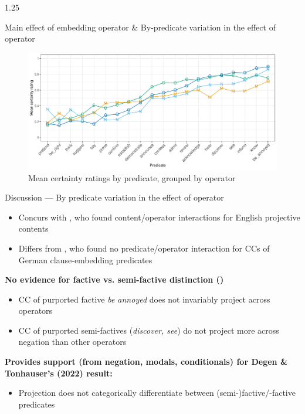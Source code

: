 \documentclass[final]{beamer}
\newlength{\colwidth}
\newlength{\vboxsep}
\begin{document}
\begin{frame}[t]
\begin{columns}[t]
\begin{column}{1.25\colwidth}
\begin{normalbox}{Main effect of embedding operator \& By-predicate variation in the effect of operator}
				\begin{figure}[h]
					\centering
					\includegraphics[width=\linewidth]{projective-pred-op.pdf}
					\vspace{-2\baselineskip}
					\caption{Mean certainty ratings by predicate, grouped by operator}
					\label{fig:figure3}
				\end{figure}
				\vspace{-.8\baselineskip}
			\end{normalbox}
			
			\vspace{\vboxsep}	
			\begin{normalbox}{Discussion --- By predicate variation in the effect of operator}
				\begin{itemize}
					\item Concurs with \citet{smith_relationship_2014}, who found content/operator interactions for English projective contents
					\item Differs from \citet{sieker_projective_2022}, who found no predicate/operator interaction for CCs of German clause-embedding predicates
				\end{itemize}
				
				\textbf{No evidence for factive vs. semi-factive distinction (\citealt{karttunen_observations_1971})}
				\begin{itemize}
					\item CC of purported factive \textit{be annoyed} does not invariably project across operators
					\item CC of purported semi-factives (\textit{discover, see}) do not project more across negation than other operators
				\end{itemize}

				\textbf{Provides support (from negation, modals, conditionals) for Degen \& Tonhauser’s (2022) result:}
				\begin{itemize}
					\item Projection does not categorically differentiate between (semi-)factive/-factive predicates 
				\end{itemize}
				

\end{normalbox}
\end{column}
\end{columns}
\end{frame}
\end{document}
